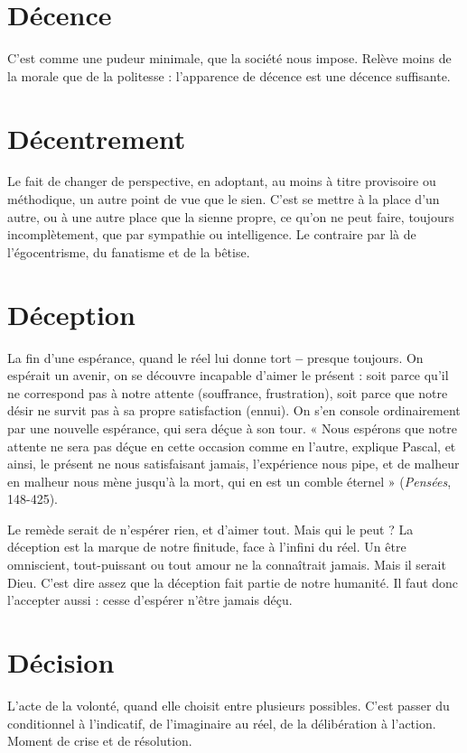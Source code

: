 \section{Décence}
C’est comme une pudeur minimale, que la société nous impose.
Relève moins de la morale que de la politesse : l'apparence de
décence est une décence suffisante.

\section{Décentrement}
Le fait de changer de perspective, en adoptant, au moins
à titre provisoire ou méthodique, un autre point de vue
que le sien. C’est se mettre à la place d’un autre, ou à une autre place que la
sienne propre, ce qu’on ne peut faire, toujours incomplètement, que par sympathie
ou intelligence. Le contraire par là de l’égocentrisme, du fanatisme et de
la bêtise.

\section{Déception}
La fin d’une espérance, quand le réel lui donne tort {\bf --} presque
toujours. On espérait un avenir, on se découvre incapable
d’aimer le présent : soit parce qu’il ne correspond pas à notre attente (souffrance,
frustration), soit parce que notre désir ne survit pas à sa propre satisfaction
(ennui). On s’en console ordinairement par une nouvelle espérance, qui
sera déçue à son tour. « Nous espérons que notre attente ne sera pas déçue en
cette occasion comme en l’autre, explique Pascal, et ainsi, le présent ne nous
satisfaisant jamais, l'expérience nous pipe, et de malheur en malheur nous
mène jusqu’à la mort, qui en est un comble éternel » ({\it Pensées}, 148-425).

Le remède serait de n’espérer rien, et d’aimer tout. Mais qui le peut ? La
déception est la marque de notre finitude, face à l'infini du réel. Un être omniscient,
tout-puissant ou tout amour ne la connaîtrait jamais. Mais il serait
Dieu. C’est dire assez que la déception fait partie de notre humanité. Il faut
donc l’accepter aussi : cesse d’espérer n’être jamais déçu.

\section{Décision}
L’acte de la volonté, quand elle choisit entre plusieurs possibles.
C’est passer du conditionnel à l'indicatif, de l’imaginaire au
réel, de la délibération à l’action. Moment de crise et de résolution.

